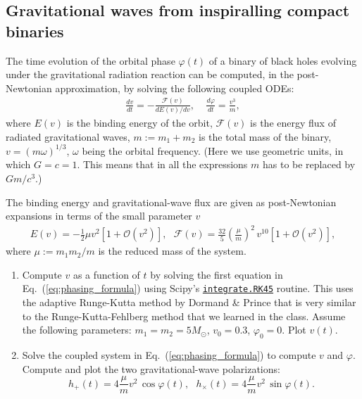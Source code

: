
\subsection{Gravitational waves from inspiralling compact binaries}

The time evolution of the orbital phase $\varphi(t)$ of a binary of black holes evolving under the gravitational radiation reaction can be computed, in the post-Newtonian approximation, by solving the following coupled ODEs: 
\begin{eqnarray}
\frac{dv}{dt} = -\frac{\mathcal{F}(v)}{dE(v)/dv}, ~~~~~ \frac{d\varphi}{dt} = \frac{v^3}{m},
\label{eq:phasing_formula}
\end{eqnarray}
where $E(v)$ is the binding energy of the orbit, $\mathcal{F}(v)$ is the energy flux of radiated gravitational waves, $m:= m_1 + m_2$ is the total mass of the binary, $v = (m \omega)^{1/3}$, $\omega$ being the orbital frequency. (Here we use geometric units, in which $G = c = 1$. This means that in all the expressions $m$ has to be replaced by $Gm/c^3$.)  

The binding energy and gravitational-wave flux are given as post-Newtonian expansions in terms of the small parameter $v$ 
\begin{eqnarray}
E(v) = -\frac{1}{2} \mu v^2 \left[1 + \mathcal{O}(v^2) \right], ~~~ \mathcal{F}(v) = \frac{32}{5} \left(\frac{\mu}{m}\right)^2 \, v^{10} \left[1 + \mathcal{O}(v^2) \right], 
\end{eqnarray}
where $\mu :=  m_1 m_2/m$ is the reduced mass of the system. 

\begin{enumerate}
\item Compute $v$ as a function of $t$ by solving the first equation in Eq.~(\ref{eq:phasing_formula}) using Scipy's \href{https://docs.scipy.org/doc/scipy/reference/generated/scipy.integrate.RK45.html}{\texttt{integrate.RK45}} routine. This uses the adaptive Runge-Kutta method by Dormand \& Prince that is very similar to the Runge-Kutta-Fehlberg method that we learned in the class. Assume the following parameters: $m_1 = m_2 = 5 M_\odot$, $v_0 = 0.3$, $\varphi_0 = 0$. Plot $v(t)$. 
\item Solve the coupled system in Eq.~(\ref{eq:phasing_formula}) to compute $v$ and $\varphi$. Compute and plot the two gravitational-wave polarizations: 
\begin{equation}
\label{eq:GWpolzn}
h_+(t)  = 4 \frac{\mu}{m} v^2 \, \cos \varphi(t), ~~~ h_\times(t)  = 4 \frac{\mu}{m} v^2 \, \sin \varphi(t). 
\end{equation}
\end{enumerate}

